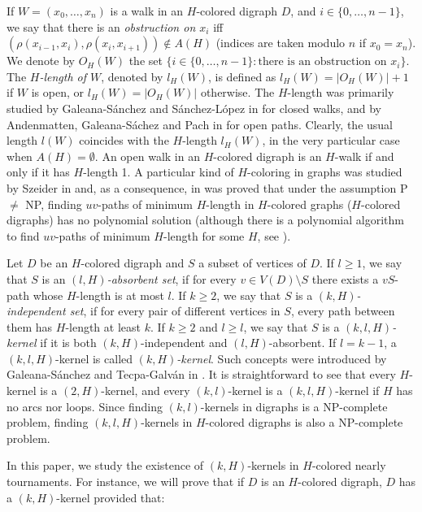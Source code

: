 \documentclass[10pt,a4paper]{article}
\begin{document}
If $W=(x_{0}, \ldots , x_{n})$ is a walk in an $H$-colored digraph $D$, and $i \in \{0, \ldots , n-1 \}$, we say that there is an \emph{obstruction on $x_{i}$} iff $(\rho (x_{i-1}, x_{i}), \rho (x_{i}, x_{i+1})) \notin A(H)$ (indices are taken modulo $n$ if $x_{0}=x_{n}$). 
We denote by $O_{H}(W)$ the set $\{ i \in \{ 0, \ldots , n-1\} : \text{there is an obstruction on }x_{i} \}$. 
The \emph{$H$-length of $W$}, denoted by $l_{H}(W)$, is defined as  $l_{H}(W)= |O_{H}(W)|+1$ if $W$ is open, or  $l_{H}(W)= |O_{H}(W)|$ otherwise. 
The $H$-length was primarily studied by Galeana-Sánchez and Sánchez-L{\'o}pez in \cite{12} for closed walks, and by Andenmatten, Galeana-Sáchez and Pach in \cite{20} for open paths.  Clearly, the usual length $l(W)$ coincides with the $H$-length $l_{H}(W)$, in the very particular case when $A(H)=\emptyset$. An open walk in an $H$-colored digraph is an $H$-walk if and only if it has $H$-length 1.
A particular kind of $H$-coloring in graphs was studied by Szeider in \cite{21} and, as a consequence, in \cite{20} was proved that under the assumption P $\neq$ NP, finding $uv$-paths of minimum $H$-length in $H$-colored graphs ($H$-colored digraphs) has no polynomial solution (although there is a polynomial algorithm to find $uv$-paths of minimum $H$-length for some $H$, see \cite{20}).  

Let $D$ be an $H$-colored digraph and $S$ a subset of vertices of $D$. 
If $l \geq 1$, we say that $S$ is an \emph{$(l, H)$-absorbent set}, if for every $v \in V(D) \setminus S$ there exists a $vS$-path whose $H$-length is at most $l$.
 If $k \geq 2$, we say that $S$ is a \emph{$(k,H)$-independent set}, if for every pair of different vertices in $S$, every path between them has $H$-length at least $k$.
  If $k\geq 2$ and $l\geq l$, we say that $S$ is a \emph{$(k, l,H)$-kernel} if it is both $(k,H)$-independent and $(l,H)$-absorbent. 
If $l=k-1$, a $(k,l,H)$-kernel is called \emph{$(k, H)$-kernel}. Such concepts were introduced by Galeana-Sánchez and Tecpa-Galván in \cite{richardHkl}.
It is straightforward to see that every $H$-kernel is a $(2,H)$-kernel, and every $(k,l)$-kernel is a $(k,l,H)$-kernel if $H$ has no arcs nor loops. Since finding $(k,l)$-kernels in digraphs is a NP-complete problem, finding $(k,l,H)$-kernels in $H$-colored digraphs is also a NP-complete problem.

In this paper, we study the existence of $(k,H)$-kernels in $H$-colored nearly tournaments. For instance, we will prove that if $D$ is an $H$-colored digraph, $D$ has a $(k,H)$-kernel provided that:
\end{document}
